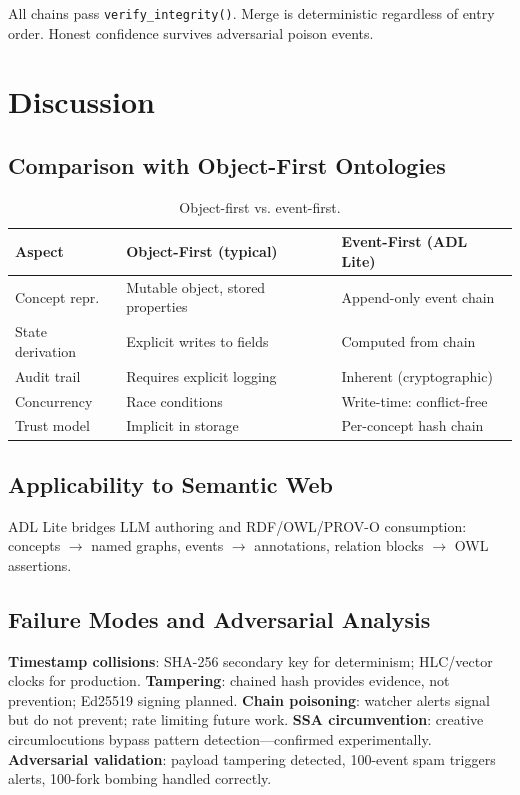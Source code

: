 \documentclass[11pt,a4paper]{article}
\theoremstyle{remark}
\begin{document}
All chains pass \texttt{verify\_integrity()}. Merge is deterministic regardless of entry order. Honest confidence survives adversarial poison events.

\section{Discussion}
\label{sec:discussion}

\subsection{Comparison with Object-First Ontologies}

\begin{table}[h]\centering\caption{Object-first vs. event-first.}\label{tab:comparison}
\begin{tabular}{p{3.5cm}p{5cm}p{5cm}}
\toprule Aspect & Object-First (typical) & Event-First (ADL Lite) \\
\midrule
Concept repr.   & Mutable object, stored properties & Append-only event chain \\
State derivation & Explicit writes to fields & Computed from chain \\
Audit trail     & Requires explicit logging & Inherent (cryptographic) \\
Concurrency     & Race conditions & Write-time: conflict-free \\
Trust model     & Implicit in storage & Per-concept hash chain \\
\bottomrule
\end{tabular}\end{table}

\subsection{Applicability to Semantic Web}

ADL Lite bridges LLM authoring and RDF/OWL/PROV-O consumption: concepts $\to$ named graphs, events $\to$ annotations, relation blocks $\to$ OWL assertions.

\subsection{Failure Modes and Adversarial Analysis}
\label{sec:failure}

\textbf{Timestamp collisions}: SHA-256 secondary key for determinism; HLC/vector clocks for production. \textbf{Tampering}: chained hash provides evidence, not prevention; Ed25519 signing planned. \textbf{Chain poisoning}: watcher alerts signal but do not prevent; rate limiting future work. \textbf{SSA circumvention}: creative circumlocutions bypass pattern detection---confirmed experimentally. \textbf{Adversarial validation}: payload tampering detected, 100-event spam triggers alerts, 100-fork bombing handled correctly.
\end{document}
